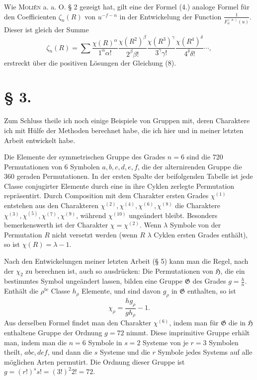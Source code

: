 \documentclass[11pt]{article}
\newcommand{\Hgr}{\mathfrak{H}}
\newcommand{\Ggr}{\mathfrak{G}}
\newcommand{\te}{\mathrm{te}}
\begin{document}
Wie \textsc{Moliên} a. a. O. § 2 gezeigt hat, gilt eine der Formel (4.) analoge Formel für den Coefficienten $\zeta_n(R)$ von $u^{-f-n}$ in der Entwickelung der Function $\frac{1}{F_\alpha^{(\varkappa)}(u)}$. Dieser ist gleich der Summe
\begin{equation*}\tag{9.}
\zeta_n(R)=\sum
\frac{\chi(R)^\alpha}{1^\alpha\alpha!}
\frac{\chi(R^2)^\beta}{2^\beta\beta!}
\frac{\chi(R^3)^\gamma}{3^\gamma\gamma!}
\frac{\chi(R^4)^\delta}{4^\delta\delta!}\cdots,
\end{equation*}
erstreckt über die positiven Lösungen der Gleichung (8).

\section*{§ 3.}

Zum Schluss theile ich noch einige Beispiele von Gruppen mit, deren Charaktere ich mit Hülfe der Methoden berechnet habe, die ich hier und in meiner letzten Arbeit entwickelt habe.

Die Elemente der symmetrischen Gruppe des Grades $n=6$ sind die 720 Permutationen von 6 Symbolen $a,b,c,d,e,f$, die der alternirenden Gruppe die 360 geraden Permutationen. In der ersten Spalte der beifolgenden Tabelle ist jede Classe conjugirter Elemente durch eine in ihre Cyklen zerlegte Permutation repräsentirt. Durch Composition mit dem Charakter ersten Grades $\chi^{(1)}$ entstehen aus den Charakteren $\chi^{(2)},\chi^{(4)},\chi^{(6)},\chi^{(8)}$ die Charaktere $\chi^{(3)},\chi^{(5)},\chi^{(7)},\chi^{(9)}$, während $\chi^{(10)}$ ungeändert bleibt. Besonders bemerkenswerth ist der Charakter $\chi=\chi^{(2)}$. Wenn $\lambda$ Symbole von der Permutation $R$ nicht versetzt werden (wenn $R$ $\lambda$ Cyklen ersten Grades enthält), so ist $\chi(R)=\lambda-1$.

Nach den Entwickelungen meiner letzten Arbeit (§ 5) kann man die Regel, nach der $\chi_2$ zu berechnen ist, auch so ausdrücken: Die Permutationen von $\Hgr$, die ein bestimmtes Symbol ungeändert lassen, bilden eine Gruppe $\Ggr$ des Grades $g=\frac{h}{n}$. Enthält die $\rho^{\te}$ Classe $h_\rho$ Elemente, und sind davon $g_\rho$ in $\Ggr$ enthalten, so ist
\begin{equation*}\tag{1.}
\chi_\rho=\frac{h g_\rho}{g h_\rho}-1.
\end{equation*}
Aus derselben Formel findet man den Charakter $\chi^{(6)}$, indem man für $\Ggr$ die in $\Hgr$ enthaltene Gruppe der Ordnung $g=72$ nimmt. Diese imprimitive Gruppe erhält man, indem man die $n=6$ Symbole in $s=2$ Systeme von je $r=3$ Symbolen theilt, $abc,def$, und dann die $s$ Systeme und die $r$ Symbole jedes Systems auf alle möglichen Arten permutirt. Die Ordnung dieser Gruppe ist $g=(r!)^s s!=(3!)^2 2!=72$.
\end{document}
